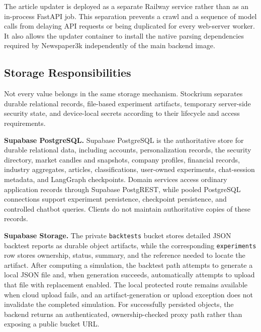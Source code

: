 The article updater is deployed as a separate Railway service rather than as an in-process FastAPI job. This separation prevents a crawl and a sequence of model calls from delaying API requests or being duplicated for every web-server worker. It also allows the updater container to install the native parsing dependencies required by Newspaper3k independently of the main backend image.

\subsection{Storage Responsibilities}
\label{subsec:storage-responsibilities}

Not every value belongs in the same storage mechanism. Stockrium separates durable relational records, file-based experiment artifacts, temporary server-side security state, and device-local secrets according to their lifecycle and access requirements.

\textbf{Supabase PostgreSQL.} Supabase PostgreSQL is the authoritative store for durable relational data, including accounts, personalization records, the security directory, market candles and snapshots, company profiles, financial records, industry aggregates, articles, classifications, user-owned experiments, chat-session metadata, and LangGraph checkpoints. Domain services access ordinary application records through Supabase PostgREST, while pooled PostgreSQL connections support experiment persistence, checkpoint persistence, and controlled chatbot queries. Clients do not maintain authoritative copies of these records.

\textbf{Supabase Storage.} The private \texttt{backtests} bucket stores detailed JSON backtest reports as durable object artifacts, while the corresponding \texttt{experiments} row stores ownership, status, summary, and the reference needed to locate the artifact. After computing a simulation, the backtest path attempts to generate a local JSON file and, when generation succeeds, automatically attempts to upload that file with replacement enabled. The local protected route remains available when cloud upload fails, and an artifact-generation or upload exception does not invalidate the completed simulation. For successfully persisted objects, the backend returns an authenticated, ownership-checked proxy path rather than exposing a public bucket URL.

